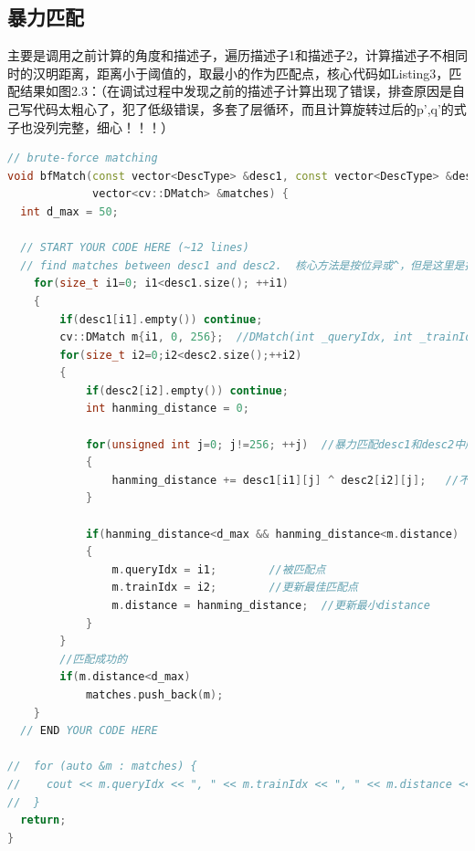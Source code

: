 \documentclass[40pt,a4paper，UTF8]{ctexart}
\numberwithin{equation}{section}
\begin{document}
\subsection{暴力匹配}
主要是调用之前计算的角度和描述子，遍历描述子1和描述子2，计算描述子不相同时的汉明距离，距离小于阈值的，取最小的作为匹配点，核心代码如Listing3，匹配结果如图2.3：（在调试过程中发现之前的描述子计算出现了错误，排查原因是自己写代码太粗心了，犯了低级错误，多套了层循环，而且计算旋转过后的p',q'的式子也没列完整，细心！！！）
\begin{lstlisting}[language=C++, caption=computeORB.cpp]
// brute-force matching
void bfMatch(const vector<DescType> &desc1, const vector<DescType> &desc2,
             vector<cv::DMatch> &matches) {
  int d_max = 50;

  // START YOUR CODE HERE (~12 lines)
  // find matches between desc1 and desc2.  核心方法是按位异或^，但是这里是按照vector<bool>的每一位来判断
    for(size_t i1=0; i1<desc1.size(); ++i1)
    {
        if(desc1[i1].empty()) continue;
        cv::DMatch m{i1, 0, 256};  //DMatch(int _queryIdx, int _trainIdx, float _distance)：_queryIdx：为第i1个点进行匹配; _trainIdx:目标点匹配点为第0个;_distance:最小距离初始化为256
        for(size_t i2=0;i2<desc2.size();++i2)
        {
            if(desc2[i2].empty()) continue;
            int hanming_distance = 0;

            for(unsigned int j=0; j!=256; ++j)  //暴力匹配desc1和desc2中所有的关键点
            {
                hanming_distance += desc1[i1][j] ^ desc2[i2][j];   //不相等时距离增加
            }

            if(hanming_distance<d_max && hanming_distance<m.distance)  //如果distance符合阈值且小于现在的distance，更新最小distance和最佳匹配点
            {
                m.queryIdx = i1;        //被匹配点
                m.trainIdx = i2;        //更新最佳匹配点
                m.distance = hanming_distance;  //更新最小distance
            }
        }
        //匹配成功的
        if(m.distance<d_max)
            matches.push_back(m);
    }
  // END YOUR CODE HERE

//  for (auto &m : matches) {
//    cout << m.queryIdx << ", " << m.trainIdx << ", " << m.distance << endl;
//  }
  return;
}
\end{lstlisting}
\end{document}
